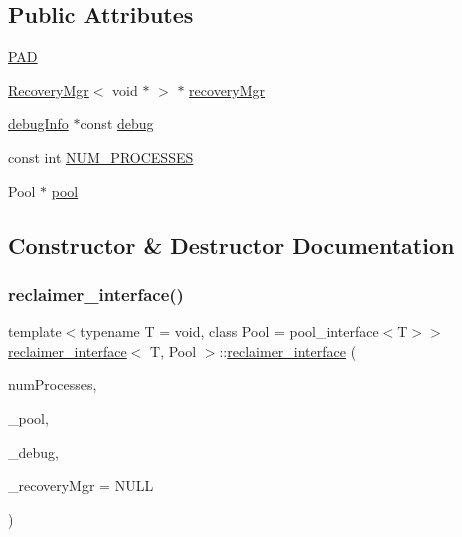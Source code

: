 \subsection*{Public Attributes}
\begin{DoxyCompactItemize}
\item 
\hyperlink{classreclaimer__interface_a105497cdc18f0306f5a612c86afa0fa6}{P\+AD}
\item 
\hyperlink{classRecoveryMgr}{Recovery\+Mgr}$<$ void $\ast$ $>$ $\ast$ \hyperlink{classreclaimer__interface_a7c9cff5fa3884b5318210f0dedb987e9}{recovery\+Mgr}
\item 
\hyperlink{classdebugInfo}{debug\+Info} $\ast$const \hyperlink{classreclaimer__interface_a617bf5436d7217b303ac65e57709618b}{debug}
\item 
const int \hyperlink{classreclaimer__interface_a6f3f1b6d104d2e4fa44d6183a6f6a2a5}{N\+U\+M\+\_\+\+P\+R\+O\+C\+E\+S\+S\+ES}
\item 
Pool $\ast$ \hyperlink{classreclaimer__interface_a5ca8f53aca95e5fb296cd0dfcd87d90f}{pool}
\end{DoxyCompactItemize}


\subsection{Constructor \& Destructor Documentation}
\mbox{\label{classreclaimer__interface_a63ff07ec643f85a3c2b8152183f37882}} 
\subsubsection{\texorpdfstring{reclaimer\+\_\+interface()}{reclaimer\_interface()}}
{\footnotesize\ttfamily template$<$typename T  = void, class Pool  = pool\+\_\+interface$<$\+T$>$$>$ \\
\hyperlink{classreclaimer__interface}{reclaimer\+\_\+interface}$<$ T, Pool $>$\+::\hyperlink{classreclaimer__interface}{reclaimer\+\_\+interface} (\begin{DoxyParamCaption}\item[{const int}]{num\+Processes,  }\item[{Pool $\ast$}]{\+\_\+pool,  }\item[{\hyperlink{classdebugInfo}{debug\+Info} $\ast$const}]{\+\_\+debug,  }\item[{\hyperlink{classRecoveryMgr}{Recovery\+Mgr}$<$ void $\ast$$>$ $\ast$const}]{\+\_\+recovery\+Mgr = {\ttfamily NULL} }\end{DoxyParamCaption})\hspace{0.3cm}{\ttfamily [inline]}}

